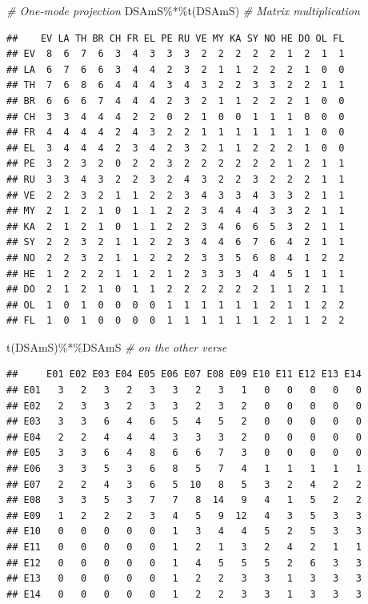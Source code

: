 \documentclass[
  notitlepage,
  onecolumn,
  openany]{book}
\newenvironment{Shaded}{\begin{snugshade}}{\end{snugshade}}
\newcommand{\CommentTok}[1]{\textcolor[rgb]{0.56,0.35,0.01}{\textit{#1}}}
\newcommand{\FunctionTok}[1]{\textcolor[rgb]{0.00,0.00,0.00}{#1}}
\newcommand{\NormalTok}[1]{#1}
\newcommand{\SpecialCharTok}[1]{\textcolor[rgb]{0.00,0.00,0.00}{#1}}
\begin{document}
\begin{Shaded}
\begin{Highlighting}[]
\CommentTok{\# One{-}mode projection}
\NormalTok{DSAmS}\SpecialCharTok{\%*\%}\FunctionTok{t}\NormalTok{(DSAmS) }\CommentTok{\# Matrix multiplication}
\end{Highlighting}
\end{Shaded}

\begin{verbatim}
##    EV LA TH BR CH FR EL PE RU VE MY KA SY NO HE DO OL FL
## EV  8  6  7  6  3  4  3  3  3  2  2  2  2  2  1  2  1  1
## LA  6  7  6  6  3  4  4  2  3  2  1  1  2  2  2  1  0  0
## TH  7  6  8  6  4  4  4  3  4  3  2  2  3  3  2  2  1  1
## BR  6  6  6  7  4  4  4  2  3  2  1  1  2  2  2  1  0  0
## CH  3  3  4  4  4  2  2  0  2  1  0  0  1  1  1  0  0  0
## FR  4  4  4  4  2  4  3  2  2  1  1  1  1  1  1  1  0  0
## EL  3  4  4  4  2  3  4  2  3  2  1  1  2  2  2  1  0  0
## PE  3  2  3  2  0  2  2  3  2  2  2  2  2  2  1  2  1  1
## RU  3  3  4  3  2  2  3  2  4  3  2  2  3  2  2  2  1  1
## VE  2  2  3  2  1  1  2  2  3  4  3  3  4  3  3  2  1  1
## MY  2  1  2  1  0  1  1  2  2  3  4  4  4  3  3  2  1  1
## KA  2  1  2  1  0  1  1  2  2  3  4  6  6  5  3  2  1  1
## SY  2  2  3  2  1  1  2  2  3  4  4  6  7  6  4  2  1  1
## NO  2  2  3  2  1  1  2  2  2  3  3  5  6  8  4  1  2  2
## HE  1  2  2  2  1  1  2  1  2  3  3  3  4  4  5  1  1  1
## DO  2  1  2  1  0  1  1  2  2  2  2  2  2  1  1  2  1  1
## OL  1  0  1  0  0  0  0  1  1  1  1  1  1  2  1  1  2  2
## FL  1  0  1  0  0  0  0  1  1  1  1  1  1  2  1  1  2  2
\end{verbatim}

\begin{Shaded}
\begin{Highlighting}[]
\FunctionTok{t}\NormalTok{(DSAmS)}\SpecialCharTok{\%*\%}\NormalTok{DSAmS }\CommentTok{\# on the other verse}
\end{Highlighting}
\end{Shaded}

\begin{verbatim}
##     E01 E02 E03 E04 E05 E06 E07 E08 E09 E10 E11 E12 E13 E14
## E01   3   2   3   2   3   3   2   3   1   0   0   0   0   0
## E02   2   3   3   2   3   3   2   3   2   0   0   0   0   0
## E03   3   3   6   4   6   5   4   5   2   0   0   0   0   0
## E04   2   2   4   4   4   3   3   3   2   0   0   0   0   0
## E05   3   3   6   4   8   6   6   7   3   0   0   0   0   0
## E06   3   3   5   3   6   8   5   7   4   1   1   1   1   1
## E07   2   2   4   3   6   5  10   8   5   3   2   4   2   2
## E08   3   3   5   3   7   7   8  14   9   4   1   5   2   2
## E09   1   2   2   2   3   4   5   9  12   4   3   5   3   3
## E10   0   0   0   0   0   1   3   4   4   5   2   5   3   3
## E11   0   0   0   0   0   1   2   1   3   2   4   2   1   1
## E12   0   0   0   0   0   1   4   5   5   5   2   6   3   3
## E13   0   0   0   0   0   1   2   2   3   3   1   3   3   3
## E14   0   0   0   0   0   1   2   2   3   3   1   3   3   3
\end{verbatim}
\end{document}
